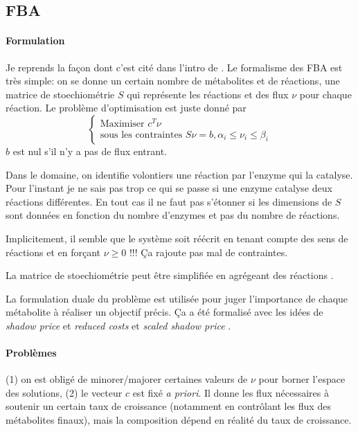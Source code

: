 \subsection{FBA}

\paragraph{Formulation} Je reprends la façon dont c'est cité dans l'intro de \citet{goelzer_cell_2011}. Le formalisme des FBA est très simple: on se donne un certain nombre de métabolites et de réactions, une matrice de stoechiométrie $S$ qui représente les réactions et des flux $\nu$ pour chaque réaction. Le problème d'optimisation est juste donné par
\[
\left\lbrace
\begin{array}{l}
  \textrm{Maximiser } c^T\nu \\
  \textrm{sous les contraintes } S\nu=b, \alpha_i \leq \nu_i \leq \beta_i
\end{array}
\right.
\]
$b$ est nul s'il n'y a pas de flux entrant.

\begin{rem}
Dans le domaine, on identifie volontiers une réaction par l'enzyme qui la catalyse. Pour l'instant je ne sais pas trop ce qui se passe si une enzyme catalyse deux réactions différentes. En tout cas il ne faut pas s'étonner si les dimensions de $S$ sont données en fonction du nombre d'enzymes et pas du nombre de réactions.
\end{rem}

\begin{rem}
Implicitement, il semble que le système soit réécrit en tenant compte des sens de réactions et en forçant $\nu \geq 0$ \citep{savinell_network_1992}!!! Ça rajoute pas mal de contraintes.
\end{rem}

\begin{rem}
La matrice de stoechiométrie peut être simplifiée en agrégeant des réactions \citep{varma_metabolic_1993}.
\end{rem}

\begin{rem}
La formulation duale du problème est utilisée pour juger l'importance de chaque métabolite à réaliser un objectif précis. Ça a été formalisé avec les idées de \textit{shadow price} et \textit{reduced costs} \citep{savinell_network_1992} et  \textit{scaled shadow price} \citep{varma_metabolic_1993-1}.
\end{rem}

\paragraph{Problèmes} (1) on est obligé de minorer/majorer certaines valeurs de $\nu$ pour borner l'espace des solutions, (2) le vecteur $c$ est fixé \textit{a priori}. Il donne les flux nécessaires à soutenir un certain taux de croissance (notamment en contrôlant les flux des métabolites finaux), mais la composition dépend en réalité du taux de croissance.

